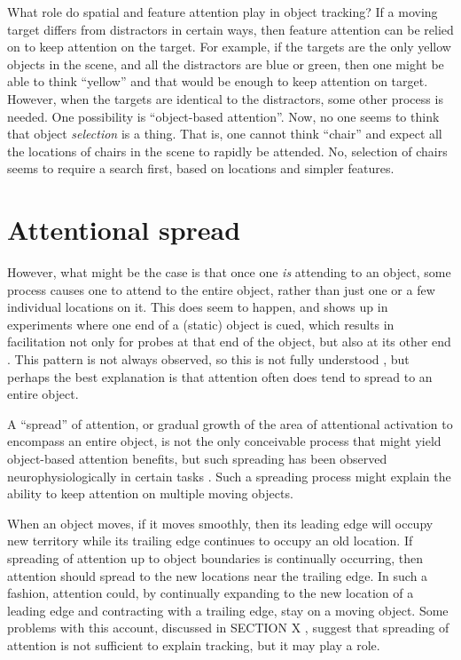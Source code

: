 \documentclass[]{book}
\begin{document}
What role do spatial and feature attention play in object tracking? If a moving target differs from distractors in certain ways, then feature attention can be relied on to keep attention on the target. For example, if the targets are the only yellow objects in the scene, and all the distractors are blue or green, then one might be able to think ``yellow'' and that would be enough to keep attention on target. However, when the targets are identical to the distractors, some other process is needed. One possibility is ``object-based attention''. Now, no one seems to think that object \emph{selection} is a thing. That is, one cannot think ``chair'' and expect all the locations of chairs in the scene to rapidly be attended. No, selection of chairs seems to require a search first, based on locations and simpler features.

\hypertarget{attentional-spread}{%
\section{Attentional spread}\label{attentional-spread}}

However, what might be the case is that once one \emph{is} attending to an object, some process causes one to attend to the entire object, rather than just one or a few individual locations on it. This does seem to happen, and shows up in experiments where one end of a (static) object is cued, which results in facilitation not only for probes at that end of the object, but also at its other end \citep{eglyShiftingVisualAttention1994a}. This pattern is not always observed, so this is not fully understood \citep{davisReversalObjectBased2005, shomsteinObjectbasedAttentionStrength2008, shomsteinObjectbasedAttentionSensory2002, louIndividualDifferencesTemporal2020}, but perhaps the best explanation is that attention often does tend to spread to an entire object.

A ``spread'' of attention, or gradual growth of the area of attentional activation to encompass an entire object, is not the only conceivable process that might yield object-based attention benefits, but such spreading has been observed neurophysiologically in certain tasks \citep[e.g.,][]{wannigAutomaticSpreadAttentional2011}. Such a spreading process might explain the ability to keep attention on multiple moving objects.

When an object moves, if it moves smoothly, then its leading edge will occupy new territory while its trailing edge continues to occupy an old location. If spreading of attention up to object boundaries is continually occurring, then attention should spread to the new locations near the trailing edge. In such a fashion, attention could, by continually expanding to the new location of a leading edge and contracting with a trailing edge, stay on a moving object. Some problems with this account, discussed in SECTION X , suggest that spreading of attention is not sufficient to explain tracking, but it may play a role.
\end{document}
